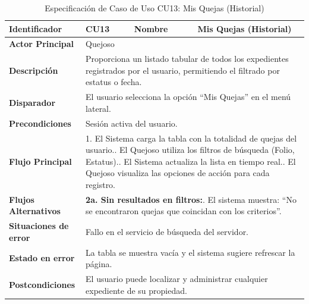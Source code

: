 \vspace{0.8cm}

\begingroup
\setlength{\parskip}{0pt}
\begin{longtable}{|p{3.5cm}|p{2cm}|p{2.5cm}|p{7cm}|}
\caption{Especificación de Caso de Uso CU13: Mis Quejas (Historial)}
\label{tab:cu13_mis_quejas} \\
\hline
\textbf{Identificador} & CU13 & \textbf{Nombre} & Mis Quejas (Historial) \\ \hline
\textbf{Actor Principal} & \multicolumn{3}{p{11.5cm}|}{Quejoso} \\ \hline
\textbf{Descripción} & \multicolumn{3}{p{11.5cm}|}{Proporciona un listado tabular de todos los expedientes registrados por el usuario, permitiendo el filtrado por estatus o fecha.} \\ \hline
\textbf{Disparador} & \multicolumn{3}{p{11.5cm}|}{El usuario selecciona la opción ``Mis Quejas'' en el menú lateral.} \\ \hline
\textbf{Precondiciones} & \multicolumn{3}{p{11.5cm}|}{Sesión activa del usuario.} \\ \hline
\textbf{Flujo Principal} & \multicolumn{3}{p{11.5cm}|}{1. El Sistema carga la tabla con la totalidad de quejas del usuario.\newline 2. El Quejoso utiliza los filtros de búsqueda (Folio, Estatus).\newline 3. El Sistema actualiza la lista en tiempo real.\newline 4. El Quejoso visualiza las opciones de acción para cada registro.} \\ \hline
\textbf{Flujos Alternativos} & \multicolumn{3}{p{11.5cm}|}{\textbf{2a. Sin resultados en filtros:}\newline 1. El sistema muestra: ``No se encontraron quejas que coincidan con los criterios''.} \\ \hline
\textbf{Situaciones de error} & \multicolumn{3}{p{11.5cm}|}{Fallo en el servicio de búsqueda del servidor.} \\ \hline
\textbf{Estado en error} & \multicolumn{3}{p{11.5cm}|}{La tabla se muestra vacía y el sistema sugiere refrescar la página.} \\ \hline
\textbf{Postcondiciones} & \multicolumn{3}{p{11.5cm}|}{El usuario puede localizar y administrar cualquier expediente de su propiedad.} \\ \hline
\end{longtable}
\endgroup

\vspace{0.8cm}

